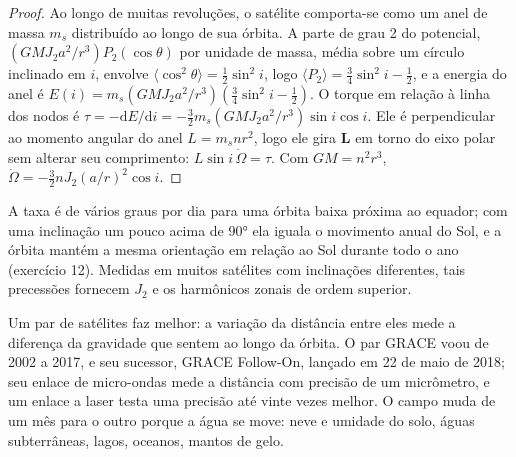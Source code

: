 \begin{proof}
Ao longo de muitas revoluções, o satélite comporta-se como um anel de massa $m_s$ distribuído ao longo
de sua órbita. A parte de grau 2 do potencial,
$(GMJ_2a^2/r^3)P_2(\cos\theta)$ por unidade de massa, média sobre um círculo inclinado
em $i$, envolve $\langle\cos^2\theta\rangle = \tfrac12\sin^2i$, logo
$\langle P_2\rangle = \tfrac34\sin^2i - \tfrac12$, e a energia do anel é
$E(i) = m_s(GMJ_2a^2/r^3)(\tfrac34\sin^2i - \tfrac12)$. O torque em relação à linha
dos nodos é $\tau = -\mathrm dE/\mathrm di = -\tfrac32m_s(GMJ_2a^2/r^3)\sin
i\cos i$. Ele é perpendicular ao momento angular do anel $L = m_snr^2$, logo
ele gira $\mathbf L$ em torno do eixo polar sem alterar seu comprimento:
$L\sin i\,\dot\Omega = \tau$. Com $GM = n^2r^3$, $\dot\Omega =
-\tfrac32nJ_2(a/r)^2\cos i$.
\end{proof}

A taxa é de vários graus por dia para uma órbita baixa próxima ao equador; com uma
inclinação um pouco acima de \ang{90} ela iguala o movimento anual do Sol, e a
órbita mantém a mesma orientação em relação ao Sol durante todo o ano (exercício 12). Medidas em
muitos satélites com inclinações diferentes, tais precessões fornecem $J_2$ e os
harmônicos zonais de ordem superior.

Um par de satélites faz melhor: a variação da distância entre eles mede a
diferença da gravidade que sentem ao longo da órbita. O par GRACE voou de 2002 a 2017, e seu
sucessor, GRACE Follow-On, lançado em 22 de maio de 2018; seu enlace de micro-ondas
mede a distância com precisão de um micrômetro, e um enlace a laser testa uma precisão
até vinte vezes melhor.
O campo muda de um mês para o outro porque a água se move: neve e umidade do solo,
águas subterrâneas, lagos, oceanos, mantos de gelo.

